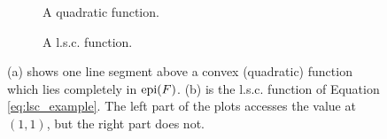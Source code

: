    \begin{figure}[ht]
        \centering
        \begin{subfigure}[b]{0.4\textwidth}
        \caption{A quadratic function.}
        \end{subfigure}
        \begin{subfigure}[b]{0.4\textwidth}
        \caption{A l.s.c. function.}
        \end{subfigure}
        \caption{(a) shows one line segment above a convex (quadratic) function which lies completely in $\textnormal{epi}(F)$. (b) is the l.s.c. function of Equation \ref{eq:lsc_example}. The left part of the plots accesses the value at $(1, 1)$, but the right part does not.}
        \label{fig:convex_function}
    \end{figure}

